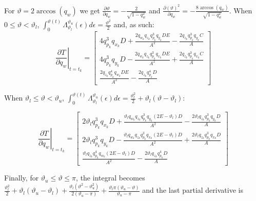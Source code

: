 \documentclass{article}
\begin{document}
		For $\vartheta = 2\arccos(q_w)$ we get $\displaystyle \frac{\partial \vartheta}{\partial q_w} = -\displaystyle \frac{2}{\sqrt{1-q_w^2}}$ and $\displaystyle \frac{\partial (\vartheta)^2}{\partial q_w} = -\displaystyle \frac{8\arccos(q_w)}{\sqrt{1-q_w^2}}$. When $0 \leq \vartheta < \vartheta_l$, $\int_0^{\vartheta(t)}{\Lambda_{\vartheta_l}^{\vartheta_u}(\epsilon)} d\epsilon = \displaystyle \frac{\vartheta^2}{2}$ and, as such:
		\[
			\left .\displaystyle \frac{\partial T}{\partial q_w}\right |_{t=t_k}  = \begin{bmatrix}
											4 q_{p_k}^3 q_{x_k} D  + \displaystyle \frac{2 q_{w_k} q_{z_k} q_{p_k}^3 q_{y_k} D E}{A^2} - \displaystyle \frac{2 q_{z_k} q_{p_k}^3 q_{y_k} C}{A}\\
											4 q_{p_k}^3 q_{y_k} D - \displaystyle \frac{2 q_{w_k} q_{z_k} q_{p_k}^3 q_{x_k} D E}{A^2} + \displaystyle \frac{2 q_{z_k} q_{p_k}^3 q_{x_k} C}{A}\\
											\displaystyle \frac{2 q_{z_k} q_{p_k}^4 q_{w_k} D E}{A^2} - \displaystyle \frac{2 q_{z_k} q_{p_k}^4 D}{A}
										\end{bmatrix} 
		\]
		
		When $\vartheta_l \leq \vartheta < \vartheta_u$, $\int_0^{\vartheta(t)}{\Lambda_{\vartheta_l}^{\vartheta_u}(\epsilon)} d\epsilon = \displaystyle \frac{\vartheta_l^2}{2} + \vartheta_l \left ( \vartheta-\vartheta_l \right )$:
		
		\[
			\left .\displaystyle \frac{\partial T}{\partial q_w}\right |_{t=t_k}  = \begin{bmatrix}
											2 \vartheta_l q_{p_k}^3 q_{x_k} D + \displaystyle \frac{\vartheta_l q_{w_k} q_{z_k} q_{p_k}^3 q_{y_k} \left (2 E-\vartheta_l \right ) D}{A^2} - \displaystyle \frac{2 \vartheta_l  q_{z_k} q_{p_k}^3 q_{y_k} D}{A}\\
											2 \vartheta_l q_{p_k}^3 q_{y_k} D - \displaystyle \frac{\vartheta_l q_{w_k} q_{z_k} q_{p_k}^3 q_{x_k}  \left (2 E-\vartheta_l \right )  D}{A^2} + \displaystyle \frac{2 \vartheta_l q_{z_k} q_{p_k}^3 q_{x_k} D}{A}\\
											\displaystyle \frac{\vartheta_l q_{z_k} q_{p_k}^4 q_{w_k} \left (2 E-\vartheta_l \right ) D}{A^2} - \displaystyle \frac{2 \vartheta_l q_{z_k} q_{p_k}^4 D}{A}
										\end{bmatrix} 
		\]
		
		Finally, for $\vartheta_u \leq \vartheta \leq \pi$, the integral becomes $\displaystyle \frac{\vartheta_l^2}{2} + \vartheta_l \left(\vartheta_u-\vartheta_l \right) + \displaystyle \frac{\vartheta_l \left (\vartheta^2 - \vartheta_u^2 \right)}{2\left(\vartheta_u - \pi \right )} + \displaystyle \frac{\vartheta_l \pi \left ( \vartheta_u - \vartheta \right)}{\vartheta_u - \pi}$ and the last partial derivative is
		
\end{document}

